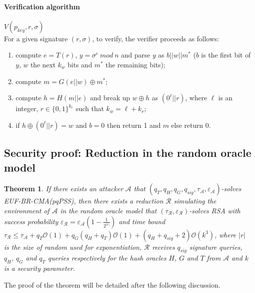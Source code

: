 \documentclass[a4paper,11pt]{article}
\newtheorem{theorem}{Theorem}[section]
\begin{document}
\paragraph{Verification algorithm}  $V(p_{key},r,\sigma)$\\
For a given signature $(r,\sigma)$, to verify, the verifier proceeds as follows:  
\begin{enumerate}
\item compute $e=T(r)$, $y= \sigma^e \ mod \ n$ and parse $y$ as $b||w||m^*$ ($b$ is the first bit of $y$,  $w$ the next $k_w$ bits and $m^*$ the remaining bits);
\item compute $m= G(e||w)\oplus m^*$;
\item compute $h=H(m||e)$ and  break up $w\oplus h$ as $(0^\ell||r)$, where $\ell$ is an integer, $r\in\{0,1\}^{k_r}$ such that $k_w=\ell+k_r$;
\item if $h\oplus (0^{\ell}||r)=w$ and $b=0$ then return 1 and $m$
else return 0.
\end{enumerate}


\subsection{Security proof: Reduction in the random oracle model}\label{sec:two:2}
\begin{theorem}
\label{theorem1}
If there exists an attacker $\mathcal{A}$ that $(q_{T}, q_{H}, q_{G} , q_{sig} , \tau_{\mathcal{A}} ,\varepsilon_{\mathcal{A}} )$-solves EUF-BR-CMA(pqPSS), then there exists a reduction $\mathcal{R}$ simulating the environment of $\mathcal{A}$ in the random oracle model that $(\tau_{\mathcal{R}} ,\varepsilon_{\mathcal{R}} )$-solves RSA with  success  probability $\varepsilon_{\mathcal{R}} = \varepsilon_{\mathcal{A}}(1-\frac{1}{2^{|r|}}) $   and time bound $\tau_{\mathcal{R}}\leq \tau_{\mathcal{A}} + q_{T}\mathcal{O}(1) + q_{G}(q_{H}+q_{T})\mathcal{O}(1)+ (q_{H}+q_{sig}+2)\mathcal{O}(k^{3})$, where $|r|$ is the size of random  used for exponentiation,  $\mathcal{R}$ receives $q_{sig}$ signature queries, $q_{H}$, $q_{G}$ and $q_{T}$  queries respectively for the hash oracles $H$, $G$ and $T$ from  $\mathcal{A}$ and  $k$ is a security parameter.

\end{theorem}

The proof of the theorem will be detailed after the following discussion.
\end{document}
